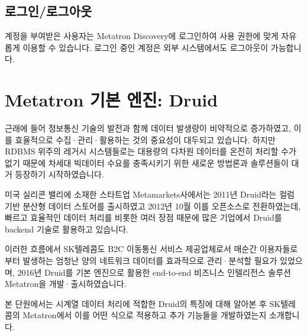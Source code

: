 \documentclass[letterpaper,10pt,english]{sphinxmanual}
\begin{document}
\subsection{로그인/로그아웃}
\label{\detokenize{discovery/part01/structure:id10}}
계정을 부여받은 사용자는 Metatron Discovery에 로그인하여 사용 권한에 맞게 자유롭게 이용할 수 있습니다. 로그인 중인 계정은 외부 시스템에서도 로그아웃이 가능합니다.


\section{Metatron 기본 엔진: Druid}
\label{\detokenize{discovery/part01/engine:metatron-druid}}\label{\detokenize{discovery/part01/engine::doc}}
근래에 들어 정보통신 기술의 발전과 함께 데이터 발생량이 비약적으로 증가하였고, 이를 효율적으로 수집·관리·활용하는 것의 중요성이 대두되고 있습니다. 하지만 RDBMS 위주의 레거시 시스템들로는 대용량의 다차원 데이터를 온전히 처리할 수가 없기 때문에 차세대 빅데이터 수요를 충족시키기 위한 새로운 방법론과 솔루션들이 대거 등장하기 시작하였습니다.

미국 실리콘 밸리에 소재한 스타트업 Metamarkets사에서는 2011년 Druid라는 컬럼 기반 분산형 데이터 스토어를 출시하였고 2012년 10월 이를 오픈소스로 전환하였는데, 빠르고 효율적인 데이터 처리를 비롯한 여러 장점 때문에 많은 기업에서 Druid를 backend 기술로 활용하고 있습니다.

이러한 흐름에서 SK텔레콤도 B2C 이동통신 서비스 제공업체로서 매순간 이용자들로부터 발생하는 엄청난 양의 네트워크 데이터를 효과적으로 관리·분석할 필요가 있었으며, 2016년 Druid를 기본 엔진으로 활용한 end-to-end 비즈니스 인텔리전스 솔루션 Metatron을 개발·출시하였습니다.
\begin{quote}

\begin{figure}[H]
\centering

\noindent{}
\end{figure}
\end{quote}

본 단원에서는 시계열 데이터 처리에 적합한 Druid의 특징에 대해 알아본 후 SK텔레콤의 Metatron에서 이를 어떤 식으로 적용하고 추가 기능들을 개발하였는지 소개합니다.
\end{document}
